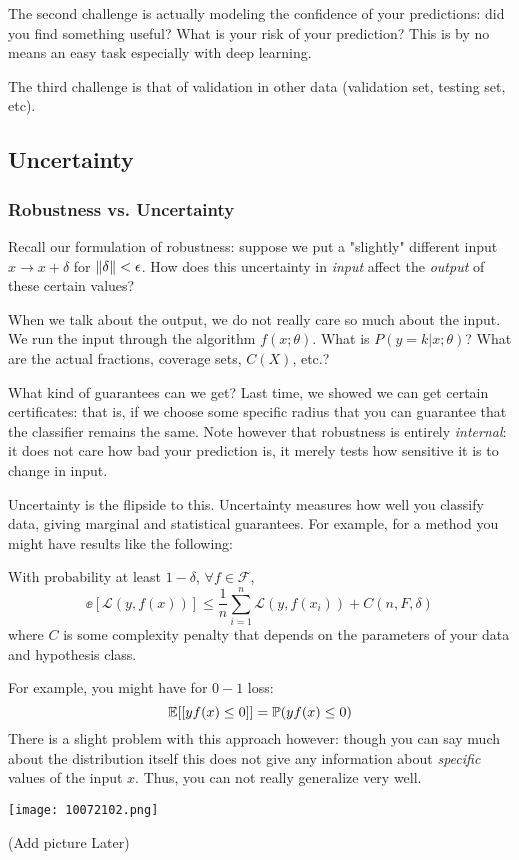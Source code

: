 \documentclass[11pt]{scrartcl}
\begin{document}
The second challenge is actually modeling the confidence of your predictions: did you find something useful? What is your risk of your prediction? This is by no means an easy task especially with deep learning. 

The third challenge is that of validation in other data (validation set, testing set, etc).

\subsection{Uncertainty}

\subsubsection{Robustness vs. Uncertainty}
Recall our formulation of robustness: suppose we put a "slightly" different input $x \to x+\delta$ for $\left\lVert\delta\right\rVert<\epsilon$. How does this uncertainty in \textit{input} affect the \textit{output} of these certain values? 

When we talk about the output, we do not really care so much about the input. We run the input through the algorithm $f(x;\theta)$. What is $P(y=k|x;\theta)$? What are the actual fractions, coverage sets, $C(X)$, etc.? 

What kind of guarantees can we get? Last time, we showed we can get certain certificates: that is, if we choose some specific radius that you can guarantee that the classifier remains the same. Note however that robustness is entirely \textit{internal}: it does not care how bad your prediction is, it merely tests how sensitive it is to change in input. 

Uncertainty is the flipside to this. Uncertainty measures how well you classify data, giving marginal and statistical guarantees. For example, for a method you might have results like the following:
\begin{ex}
With probability at least $1-\delta$, $\forall{f} \in \mathcal{F}$, $$\ee[\mathcal{L}(y,f(x))] \le \frac{1}{n}\sum_{i=1}^{n}\mathcal{L}(y,f(x_i))+C(n,F,\delta)$$
where $C$ is some complexity penalty that depends on the parameters of your data and hypothesis class. 
\end{ex}

For example, you might have for $0-1$ loss: $$\mathbb{E}[[yf(x) \le 0]] = \mathbb{P}(yf(x) \le 0)$$
There is a slight problem with this approach however: though you can say much about the distribution itself this does not give any information about \textit{specific} values of the input $x$. Thus, you can not really generalize very well. 
\begin{center}
    \texttt{[image: 10072102.png]}
\end{center}
(Add picture Later)
\end{document}
